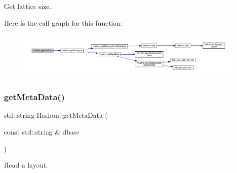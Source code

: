Get lattice size. 

Here is the call graph for this function\+:\nopagebreak
\begin{figure}[H]
\begin{center}
\leavevmode
\includegraphics[width=350pt]{d1/daf/namespaceHadron_aa639c858514f322eb7ee4c074924746a_cgraph}
\end{center}
\end{figure}
\mbox{\label{namespaceHadron_a6c9f3d44d269357faf4d786cc73ec742}} 
\subsubsection{\texorpdfstring{getMetaData()}{getMetaData()}}
{\footnotesize\ttfamily std\+::string Hadron\+::get\+Meta\+Data (\begin{DoxyParamCaption}\item[{const std\+::string \&}]{dbase }\end{DoxyParamCaption})}



Read a layout. 


